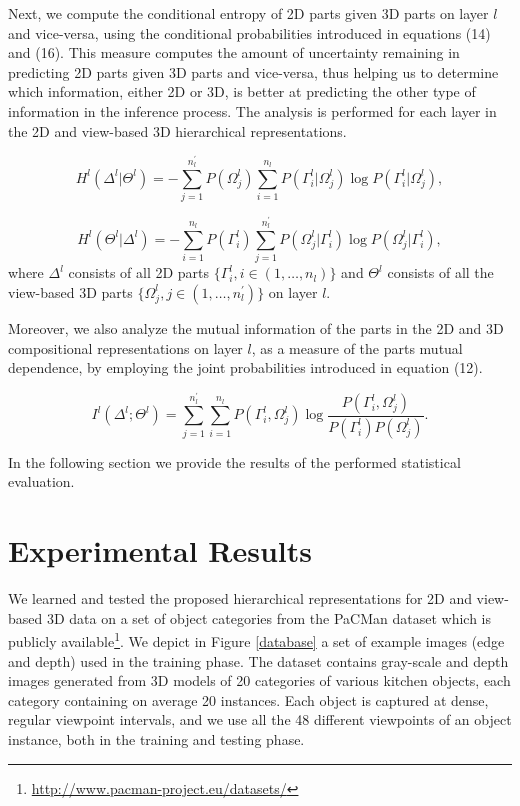 \documentclass[runningheads]{llncs}
\begin{document}
Next, we compute the conditional entropy of 2D parts given 3D parts on layer $l$ and vice-versa, using the conditional probabilities introduced in equations (14) and (16). This measure computes the amount of uncertainty remaining in predicting 2D parts given 3D parts and vice-versa, thus helping us to determine which information, either 2D or 3D, is better at predicting the other type of information in the inference process. The analysis is performed for each layer in the 2D and view-based 3D hierarchical representations.

\begin{equation}
 H^l(\Delta^l|\Theta^l) = -\sum\limits_{j=1}^{n_l^{'}}P({\Omega_j^l})\sum\limits_{i=1}^{n_l}P(\Gamma_i^l|\Omega_j^l)\log P(\Gamma_i^l|\Omega_j^l), 
\end{equation}

\begin{equation}
 H^l(\Theta^l|\Delta^l) = -\sum\limits_{i=1}^{n_l}P({\Gamma_i^l})\sum\limits_{j=1}^{n_l^{'}}P(\Omega_j^l|\Gamma_i^l)\log P(\Omega_j^l|\Gamma_i^l),
\end{equation}
where $\Delta^l$ consists of all 2D parts $\{\Gamma_i^l, i \in (1,\ldots,n_l)\}$ and $\Theta^l$ consists of all the view-based 3D parts $\{\Omega_j^l, j \in (1,\ldots,n_l^{'})\}$ on layer $l$.

Moreover, we also analyze the mutual information of the parts in the 2D and 3D compositional representations on layer $l$, as a measure of the parts mutual dependence, by employing the joint probabilities introduced in equation (12).

\begin{equation}
 I^l(\Delta^l;\Theta^l) = \sum\limits_{j=1}^{n_l^{'}}\sum\limits_{i=1}^{n_l}P({\Gamma_i^l},\Omega_j^l)\log \frac{P({\Gamma_i^l},\Omega_j^l)}{P({\Gamma_i^l})P(\Omega_j^l)}.
\end{equation}

In the following section we provide the results of the performed statistical evaluation.

\section{Experimental Results}

We learned and tested the proposed hierarchical representations for 2D and view-based 3D data on a set of object categories from the PaCMan dataset which is publicly available\footnote{\url{http://www.pacman-project.eu/datasets/}}. We depict in Figure \ref{database} a set of example images (edge and depth) used in the training phase. The dataset contains gray-scale and depth images generated from 3D models of 20 categories of various kitchen objects, each category containing on average 20 instances. Each object is captured at dense, regular viewpoint intervals, and we use all the 48 different viewpoints of an object instance, both in the training and testing phase.
\end{document}

